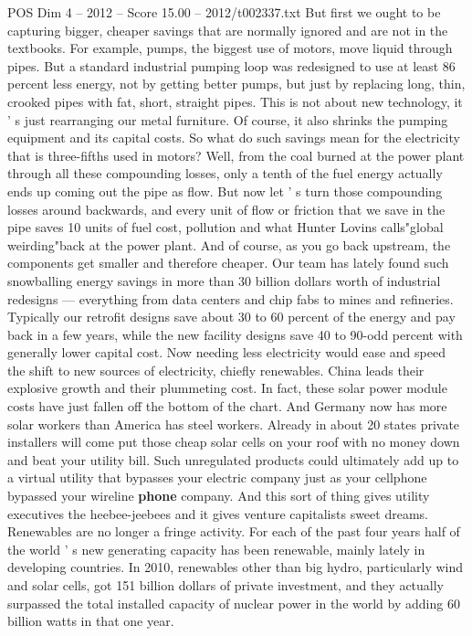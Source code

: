 \begin{textsample}{POS Dim 4 – 2012 – Score 15.00 – 2012/t002337.txt}
But first we ought to be capturing bigger, cheaper savings that are normally ignored and are not in the textbooks.
For example, pumps, the biggest use of motors, move liquid through pipes.
But a standard industrial pumping loop was redesigned to use at least 86 percent less energy, not by getting better pumps, but just by replacing long, thin, crooked pipes with fat, short, straight pipes.
This is not about new technology, it ' s just rearranging our metal furniture.
Of course, it also shrinks the pumping equipment and its capital costs.
So what do such savings mean for the electricity that is three-fifths used in motors?
Well, from the coal burned at the power plant through all these compounding losses, only a tenth of the fuel energy actually ends up coming out the pipe as flow.
But now let ' s turn those compounding losses around backwards, and every unit of flow or friction that we save in the pipe saves 10 units of fuel cost, pollution and what Hunter Lovins calls"global weirding"back at the power plant.
And of course, as you go back upstream, the components get smaller and therefore cheaper.
Our team has lately found such snowballing energy savings in more than 30 billion dollars worth of industrial redesigns — everything from data centers and chip fabs to mines and refineries.
Typically our retrofit designs save about 30 to 60 percent of the energy and pay back in a few years, while the new facility designs save 40 to 90-odd percent with generally lower capital cost.
Now needing less electricity would ease and speed the shift to new sources of electricity, chiefly renewables.
China leads their explosive growth and their plummeting cost.
In fact, these solar power module costs have just fallen off the bottom of the chart.
And Germany now has more solar workers than America has steel workers.
Already in about 20 states private installers will come put those cheap solar cells on your roof with no money down and beat your utility bill.
Such unregulated products could ultimately add up to a virtual utility that bypasses your electric company just as your cellphone bypassed your wireline \textbf{phone} company.
And this sort of thing gives utility executives the heebee-jeebees and it gives venture capitalists sweet dreams.
Renewables are no longer a fringe activity.
For each of the past four years half of the world ' s new generating capacity has been renewable, mainly lately in developing countries.
In 2010, renewables other than big hydro, particularly wind and solar cells, got 151 billion dollars of private investment, and they actually surpassed the total installed capacity of nuclear power in the world by adding 60 billion watts in that one year.

\end{textsample}

